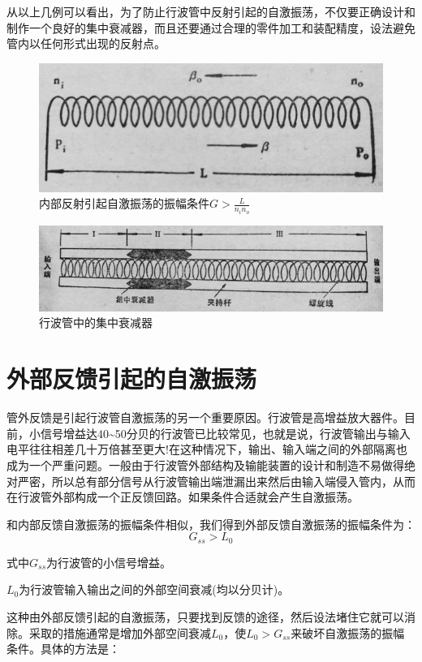 从以上几例可以看出，为了防止行波管中反射引起的自激振荡，不仅要正确设计和制作一个良好的集中衰减器，而且还要通过合理的零件加工和装配精度，设法避免管内以任何形式出现的反射点。

\begin{figure}[phtb]
	\centering
	\includegraphics[width=0.55\linewidth]{figure/ch5-1}
	\caption{内部反射引起自激振荡的振幅条件$ G>\frac{L}{n_i n_o} $}
	\label{ch5-1}
\end{figure}

\begin{figure}[phtb]
	\centering
	\includegraphics[width=0.65\linewidth]{figure/ch5-2}
	\caption{行波管中的集中衰减器}
	\label{ch5-2}
\end{figure}
\section{外部反馈引起的自激振荡}


管外反馈是引起行波管自激振荡的另一个重要原因。行波管是高增益放大器件。目前，小信号增益达40\textasciitilde50分贝的行波管已比较常见，也就是说，行波管输出与输入电平往往相差几十万倍甚至更大!在这种情况下，输出、输入端之间的外部隔离也成为一个严重问题。一般由于行波管外部结构及输能装置的设计和制造不易做得绝对严密，所以总有部分信号从行波管输出端泄漏出来然后由输入端侵入管内，从而在行波管外部构成一个正反馈回路。如果条件合适就会产生自激振荡。


和内部反馈自激振荡的振幅条件相似，我们得到外部反馈自激振荡的振幅条件为：
\begin{equation} \label{eq:5-4}
	G_{ss} > L_0
\end{equation}

式中$ G_{ss} $为行波管的小信号增益。


$ L_0 $为行波管输入输出之间的外部空间衰减(均以分贝计)。


这种由外部反馈引起的自激振荡，只要找到反馈的途径，然后设法堵住它就可以消除。采取的措施通常是增加外部空间衰减$ L_0 $，使$ L_0 > G_{ss} $来破坏自激振荡的振幅条件。具体的方法是：


